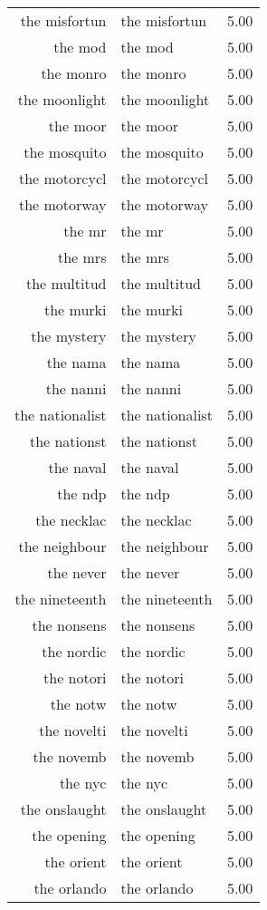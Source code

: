 \begin{table}[ht]
\begin{tabular}{rlr}
  the misfortun & the misfortun & 5.00 \\ 
  the mod & the mod & 5.00 \\ 
  the monro & the monro & 5.00 \\ 
  the moonlight & the moonlight & 5.00 \\ 
  the moor & the moor & 5.00 \\ 
  the mosquito & the mosquito & 5.00 \\ 
  the motorcycl & the motorcycl & 5.00 \\ 
  the motorway & the motorway & 5.00 \\ 
  the mr & the mr & 5.00 \\ 
  the mrs & the mrs & 5.00 \\ 
  the multitud & the multitud & 5.00 \\ 
  the murki & the murki & 5.00 \\ 
  the mystery & the mystery & 5.00 \\ 
  the nama & the nama & 5.00 \\ 
  the nanni & the nanni & 5.00 \\ 
  the nationalist & the nationalist & 5.00 \\ 
  the nationst & the nationst & 5.00 \\ 
  the naval & the naval & 5.00 \\ 
  the ndp & the ndp & 5.00 \\ 
  the necklac & the necklac & 5.00 \\ 
  the neighbour & the neighbour & 5.00 \\ 
  the never & the never & 5.00 \\ 
  the nineteenth & the nineteenth & 5.00 \\ 
  the nonsens & the nonsens & 5.00 \\ 
  the nordic & the nordic & 5.00 \\ 
  the notori & the notori & 5.00 \\ 
  the notw & the notw & 5.00 \\ 
  the novelti & the novelti & 5.00 \\ 
  the novemb & the novemb & 5.00 \\ 
  the nyc & the nyc & 5.00 \\ 
  the onslaught & the onslaught & 5.00 \\ 
  the opening & the opening & 5.00 \\ 
  the orient & the orient & 5.00 \\ 
  the orlando & the orlando & 5.00 \\ 

\end{tabular}
\end{table}
